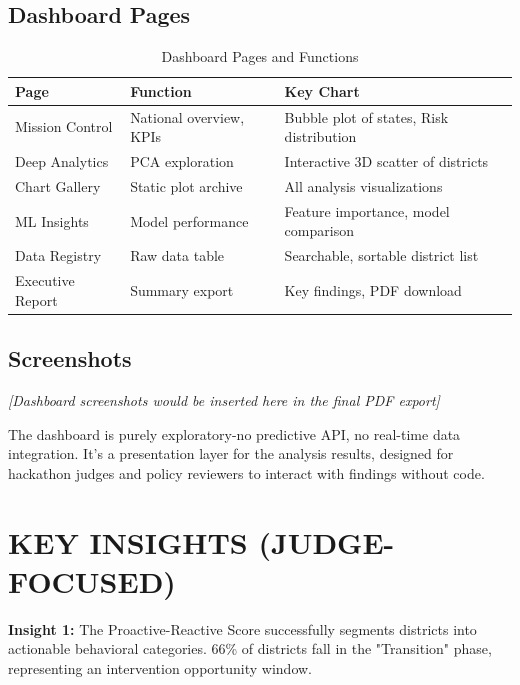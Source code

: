 \documentclass[11pt, a4paper]{article}
\begin{document}
\subsection{Dashboard Pages}

\vspace{0.8em}
\begin{table}[H]
\caption{Dashboard Pages and Functions}
{\small
\begin{tabularx}{\textwidth}{|Y|Y|Y|}
\hline
\textbf{Page} & \textbf{Function} & \textbf{Key Chart} \\ \hline
Mission Control & National overview, KPIs & Bubble plot of states, Risk distribution \\ \hline
Deep Analytics & PCA exploration & Interactive 3D scatter of districts \\ \hline
Chart Gallery & Static plot archive & All analysis visualizations \\ \hline
ML Insights & Model performance & Feature importance, model comparison \\ \hline
Data Registry & Raw data table & Searchable, sortable district list \\ \hline
Executive Report & Summary export & Key findings, PDF download \\ \hline
\end{tabularx}
}
\end{table}
\vspace{1em}

\subsection{Screenshots}

\textit{[Dashboard screenshots would be inserted here in the final PDF export]}


The dashboard is purely exploratory-no predictive API, no real-time data integration. It's a presentation layer for the analysis results, designed for hackathon judges and policy reviewers to interact with findings without code.




\section{KEY INSIGHTS (JUDGE-FOCUSED)}

\textbf{Insight 1:} The Proactive-Reactive Score successfully segments districts into actionable behavioral categories. 66\% of districts fall in the "Transition" phase, representing an intervention opportunity window.
\end{document}
